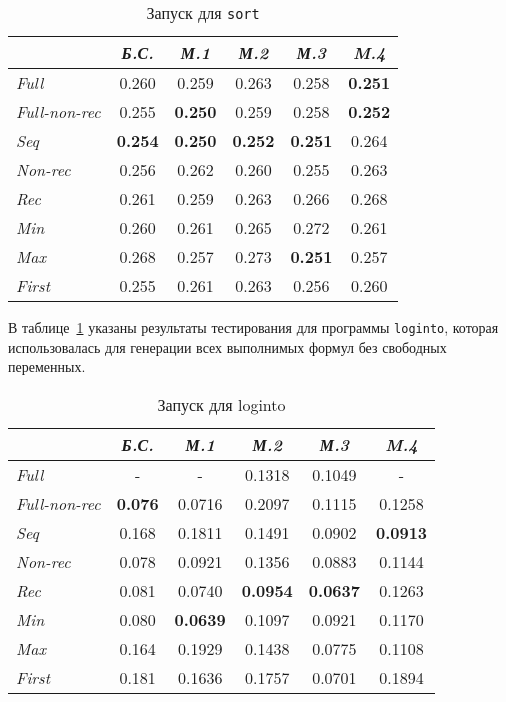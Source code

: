 \begin{table}[h!]

\center
\begin{tabular}{|l|c|c|c|c|c|}
\hline
                  &{\it Б.С.}&{\it М.1}&{\it М.2}&{\it М.3}&{\it M.4} \\ \hline
{\it Full        }&0.260       & 0.259        &  0.263       & 0.258       & {\bf 0.251} \\ \hline
{\it Full-non-rec}&0.255       & {\bf 0.250}  &  0.259       & 0.258       & {\bf 0.252} \\ \hline
{\it Seq         }&{\bf 0.254} & {\bf 0.250}  &  {\bf 0.252} & {\bf 0.251} & 0.264 \\ \hline
{\it Non-rec     }&0.256       & 0.262        &  0.260       & 0.255       & 0.263 \\ \hline
{\it Rec         }&0.261       & 0.259        &  0.263       & 0.266       & 0.268 \\ \hline
{\it Min         }&0.260       & 0.261        &  0.265       & 0.272       & 0.261 \\ \hline
{\it Max         }&0.268       & 0.257        &  0.273       & {\bf 0.251} & 0.257 \\ \hline
{\it First       }&0.255       & 0.261        &  0.263       & 0.256       & 0.260 \\ \hline
\end{tabular}
\caption{Запуск для \lstinline{sort}}
\label{fig:sortTest}
\end{table}

В таблице~\ref{fig:sortTest} указаны результаты тестирования для
программы \lstinline{loginto}, которая использовалась для генерации всех выполнимых формул
без свободных переменных.

\begin{table}[h!]
\center
\begin{tabular}{|l|c|c|c|c|c|}
\hline
   &{\it Б.С.}&{\it М.1}&{\it М.2}&{\it М.3}&{\it M.4} \\ \hline
{\it Full        } &    -        &    -         & 0.1318       &  0.1049       &    -   \\ \hline
{\it Full-non-rec} & {\bf 0.076} & 0.0716       & 0.2097       &  0.1115       & 0.1258 \\ \hline
{\it Seq         } & 0.168       & 0.1811       & 0.1491       &  0.0902       & {\bf 0.0913} \\ \hline
{\it Non-rec     } & 0.078       & 0.0921       & 0.1356       &  0.0883       & 0.1144 \\ \hline
{\it Rec         } & 0.081       & 0.0740       & {\bf 0.0954} &  {\bf 0.0637} & 0.1263 \\ \hline
{\it Min         } & 0.080       & {\bf 0.0639} & 0.1097       &  0.0921       & 0.1170 \\ \hline
{\it Max         } & 0.164       & 0.1929       & 0.1438       &  0.0775       & 0.1108 \\ \hline
{\it First       } & 0.181       & 0.1636       & 0.1757       &  0.0701       & 0.1894 \\ \hline
\end{tabular}
\caption{Запуск для loginto }
\end{table}

